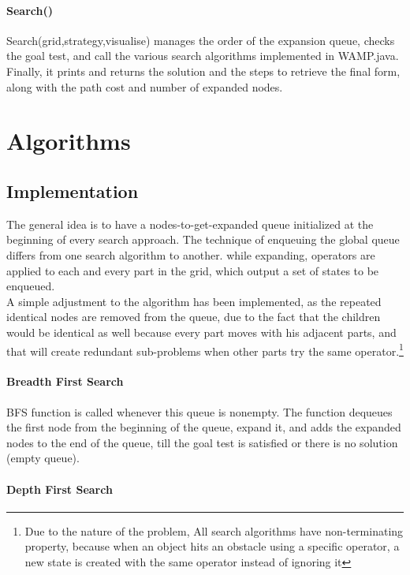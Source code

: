 \subsubsection{Search()}
Search(grid,strategy,visualise) manages the order of the expansion queue, checks the goal test, and call the various search algorithms implemented in WAMP.java. Finally, it prints and returns the solution and the steps to retrieve the final form, along with the path cost and number of expanded nodes. 


\chapter{Algorithms}
\section{Implementation}

The general idea is to have a nodes-to-get-expanded queue initialized at the beginning of every search approach. The technique of enqueuing the global queue differs from one search algorithm to another. while expanding, operators are applied to each and every part in the grid, which output a set of states to be enqueued. \\

A simple adjustment to the algorithm has been implemented, as the repeated identical nodes are removed from the queue, due to the fact that the children would be identical as well because every part moves with his adjacent parts, and that will create redundant sub-problems when other parts try the same operator.\footnote{Due to the nature of the problem, All search algorithms have non-terminating property, because when an object hits an obstacle using a specific operator, a new state is created with the same operator instead of ignoring it}

\subsubsection{Breadth First Search}

BFS function is called whenever this queue is nonempty. The function dequeues the first node from the beginning of the queue, expand it, and adds the expanded nodes to the end of the queue, till the goal test is satisfied or there is no solution (empty queue).

 

\subsubsection{Depth First Search}

